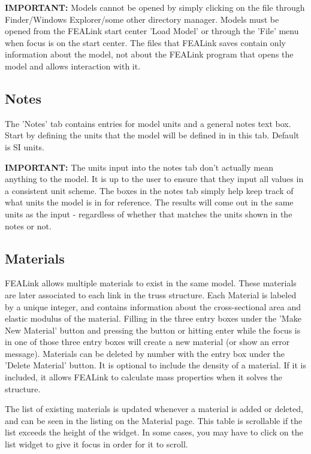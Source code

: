 \documentclass[11pt, oneside]{article}   	%
\begin{document}
\textbf{IMPORTANT:} Models cannot be opened by simply clicking on the file through Finder/Windows Explorer/some other directory manager.  Models must be opened from the FEALink start center 'Load Model' or through the 'File' menu when focus is on the start center.  The files that FEALink saves contain only information about the model, not about the FEALink program that opens the model and allows interaction with it.

\subsection{Notes}
The 'Notes' tab contains entries for model units and a general notes text box.  Start by defining the units that the model will be defined in in this tab.  Default is SI units.

\textbf{IMPORTANT:} The units input into the notes tab don't actually mean anything to the model.  It is up to the user to ensure that they input all values in a consistent unit scheme.  The boxes in the notes tab simply help keep track of what units the model is in for reference.  The results will come out in the same units as the input - regardless of whether that matches the units shown in the notes or not.

\subsection{Materials}
FEALink allows multiple materials to exist in the same model.  These materials are later associated to each link in the truss structure.  Each Material is labeled by a unique integer, and contains information about the cross-sectional area and elastic modulus of the material.  Filling in the three entry boxes under the 'Make New Material' button and pressing the button or hitting enter while the focus is in one of those three entry boxes will create a new material (or show an error message).  Materials can be deleted by number with the entry box under the 'Delete Material' button.  It is optional to include the density of a material.  If it is included, it allows FEALink to calculate mass properties when it solves the structure.

The list of existing materials is updated whenever a material is added or deleted, and can be seen in the listing on the Material page.  This table is scrollable if the list exceeds the height of the widget.  In some cases, you may have to click on the list widget to give it focus in order for it to scroll.  
\end{document}
